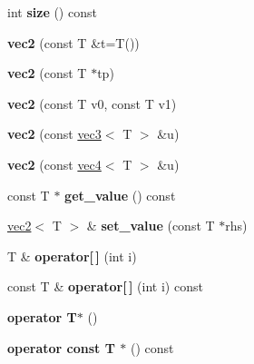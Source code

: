 \begin{DoxyCompactItemize}
\item 
\hypertarget{classnv_1_1vec2_a7bf2d668490afe40c64f20075d7b40a7}{}\label{classnv_1_1vec2_a7bf2d668490afe40c64f20075d7b40a7} 
int {\bfseries size} () const
\item 
\hypertarget{classnv_1_1vec2_aa7fc58dbc70f7868151241a774e9a373}{}\label{classnv_1_1vec2_aa7fc58dbc70f7868151241a774e9a373} 
{\bfseries vec2} (const T \&t=T())
\item 
\hypertarget{classnv_1_1vec2_ac7e7e13b6cd5d421b26d6bec20102a7a}{}\label{classnv_1_1vec2_ac7e7e13b6cd5d421b26d6bec20102a7a} 
{\bfseries vec2} (const T $\ast$tp)
\item 
\hypertarget{classnv_1_1vec2_aa78e02de943252a1404231965f4c40c0}{}\label{classnv_1_1vec2_aa78e02de943252a1404231965f4c40c0} 
{\bfseries vec2} (const T v0, const T v1)
\item 
\hypertarget{classnv_1_1vec2_a3c6b381a695bb5a78c1994ced890125b}{}\label{classnv_1_1vec2_a3c6b381a695bb5a78c1994ced890125b} 
{\bfseries vec2} (const \hyperlink{classnv_1_1vec3}{vec3}$<$ T $>$ \&u)
\item 
\hypertarget{classnv_1_1vec2_aca83899c4d744af570583db60cc71ecc}{}\label{classnv_1_1vec2_aca83899c4d744af570583db60cc71ecc} 
{\bfseries vec2} (const \hyperlink{classnv_1_1vec4}{vec4}$<$ T $>$ \&u)
\item 
\hypertarget{classnv_1_1vec2_a4fb97a538e0a20128ad91b8faacf818e}{}\label{classnv_1_1vec2_a4fb97a538e0a20128ad91b8faacf818e} 
const T $\ast$ {\bfseries get\+\_\+value} () const
\item 
\hypertarget{classnv_1_1vec2_af344f6a9264866e16bf4b069883e89f9}{}\label{classnv_1_1vec2_af344f6a9264866e16bf4b069883e89f9} 
\hyperlink{classnv_1_1vec2}{vec2}$<$ T $>$ \& {\bfseries set\+\_\+value} (const T $\ast$rhs)
\item 
\hypertarget{classnv_1_1vec2_ac2e9b4d7fa0fcd118ff28a17bebf60aa}{}\label{classnv_1_1vec2_ac2e9b4d7fa0fcd118ff28a17bebf60aa} 
T \& {\bfseries operator\mbox{[}$\,$\mbox{]}} (int i)
\item 
\hypertarget{classnv_1_1vec2_a2657fd53460fd942cb1c4100a30677b2}{}\label{classnv_1_1vec2_a2657fd53460fd942cb1c4100a30677b2} 
const T \& {\bfseries operator\mbox{[}$\,$\mbox{]}} (int i) const
\item 
\hypertarget{classnv_1_1vec2_a34d932372f208dc62ebe2e16bbc82829}{}\label{classnv_1_1vec2_a34d932372f208dc62ebe2e16bbc82829} 
{\bfseries operator T$\ast$} ()
\item 
\hypertarget{classnv_1_1vec2_af755e2a94824bc9a90492d0087d5d981}{}\label{classnv_1_1vec2_af755e2a94824bc9a90492d0087d5d981} 
{\bfseries operator const T $\ast$} () const
\end{DoxyCompactItemize}
